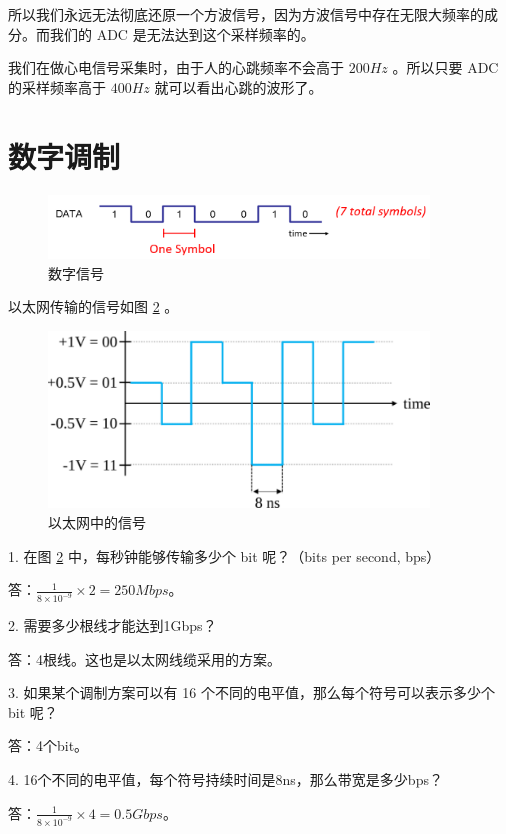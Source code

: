 \documentclass[lang=cn,newtx,10pt,scheme=chinese]{elegantbook}
\begin{document}
\begin{marker}
    所以我们永远无法彻底还原一个方波信号，因为方波信号中存在无限大频率的成分。而我们的 ADC 是无法达到这个采样频率的。

    我们在做心电信号采集时，由于人的心跳频率不会高于 $200Hz$ 。所以只要 ADC 的采样频率高于 $400Hz$ 就可以看出心跳的波形了。
\end{marker}

\section{数字调制}

\begin{figure}[!htb]
\centering
\includegraphics[width=0.9\textwidth]{symbols.png}
\caption{数字信号}
\label{fig:symbols}
\end{figure}

以太网传输的信号如图 \ref{fig:ethernet} 。

\begin{figure}[!htb]
\centering
\includegraphics[width=0.9\textwidth]{ethernet.pdf}
\caption{以太网中的信号}
\label{fig:ethernet}
\end{figure}

\begin{marker}
    1. 在图 \ref{fig:ethernet} 中，每秒钟能够传输多少个 bit 呢？（bits per second, bps）
    
    答：$\frac{1}{8 \times 10^{-9}}\times 2 = 250Mbps$。

    2. 需要多少根线才能达到1Gbps？

    答：4根线。这也是以太网线缆采用的方案。

    3. 如果某个调制方案可以有 16 个不同的电平值，那么每个符号可以表示多少个 bit 呢？

    答：4个bit。

    4. 16个不同的电平值，每个符号持续时间是8ns，那么带宽是多少bps？

    答：$\frac{1}{8 \times 10^{-9}}\times 4 = 0.5Gbps$。
\end{marker}
\end{document}
